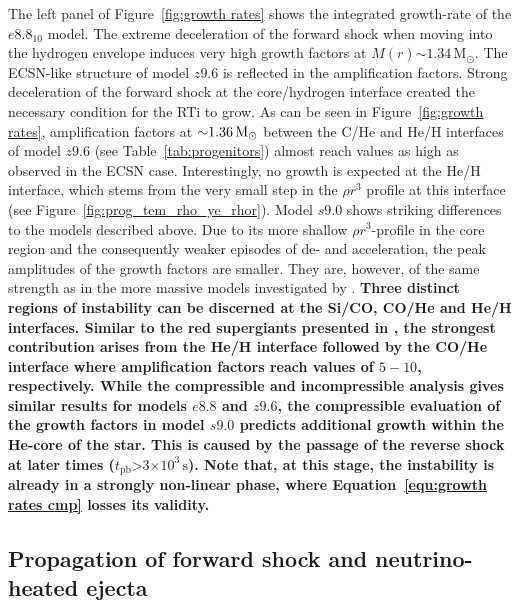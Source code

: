\documentclass[fleqn,usenatbib]{mnras}
\newcommand{\tpb}{\ensuremath{t_{\text{pb}}}}
\newcommand{\solm}{\ensuremath{\rm{M_{\odot}}}\xspace}
\newcommand{\s}{\ensuremath{\text{s}}}
\begin{document}
The left panel of Figure~\ref{fig:growth rates} shows the integrated growth-rate of the $e8.8_{10}$ model.
The extreme deceleration of the forward shock when moving into the hydrogen envelope induces very high growth factors at $M(r)\mathord{\sim}1.34\,\mathrm{M_{\odot}}$.
The ECSN-like structure of model $z9.6$ is reflected in the amplification factors.
Strong deceleration of the forward shock at the core/hydrogen interface created the necessary condition for the RTi to grow. As can be seen in Figure~\ref{fig:growth rates}, amplification factors at $\mathord{\sim}1.36\,\solm$ between the C/He and He/H interfaces of model $z9.6$ (see Table~\ref{tab:progenitors}) almost reach values as high as observed in the ECSN case. Interestingly, no growth is expected at the He/H interface, which stems from the very small step in the $\rho r^3$ profile at this interface (see Figure~\ref{fig:prog_tem_rho_ye_rhor}).
Model $s9.0$ shows striking differences to the models described above. 
Due to its more shallow $\rho r^3$-profile in the core region and the consequently weaker episodes of de- and acceleration, the peak amplitudes of the growth factors are smaller. They are, however, of the same strength as in the more massive models investigated by \cite{Wongwathanarat2015}. 
\textbf{
Three distinct regions of instability can be discerned at the Si/CO, CO/He and He/H interfaces. 
Similar to the red supergiants presented in \citet{Wongwathanarat2015}, the strongest contribution arises from the He/H interface followed by the CO/He interface where amplification factors  reach values of $5-10$, respectively. 
While the compressible and incompressible analysis gives similar results for models $e8.8$ and $z9.6$, the compressible evaluation of the growth factors in model $s9.0$ predicts additional growth within the He-core of the star. This is caused by the passage of the reverse shock at later times ($\tpb\mathord{>}3\mathord{\times}10^3\,\s$). Note that, at this stage, the instability is already in a strongly non-linear phase, where Equation~\ref{equ:growth rates cmp} losses its validity.
}
\subsection{Propagation of forward shock and neutrino-heated ejecta }
\end{document}
